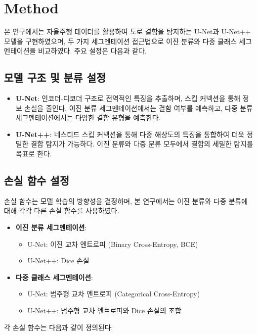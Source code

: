 \section{Method}

본 연구에서는 자율주행 데이터를 활용하여 도로 결함을 탐지하는 U-Net과 U-Net++ 모델을 구현하였으며, 두 가지 세그멘테이션 접근법으로 이진 분류와 다중 클래스 세그멘테이션을 비교하였다. 주요 설정은 다음과 같다.

\subsection{모델 구조 및 분류 설정}
\begin{itemize}
    \item \textbf{U-Net}: 인코더-디코더 구조로 전역적인 특징을 추출하며, 스킵 커넥션을 통해 정보 손실을 줄인다. 이진 분류 세그멘테이션에서는 결함 여부를 예측하고, 다중 분류 세그멘테이션에서는 다양한 결함 유형을 예측한다.
    \item \textbf{U-Net++}: 네스티드 스킵 커넥션을 통해 다중 해상도의 특징을 통합하여 더욱 정밀한 결함 탐지가 가능하다. 이진 분류와 다중 분류 모두에서 결함의 세밀한 탐지를 목표로 한다.
\end{itemize}

\subsection{손실 함수 설정}
손실 함수는 모델 학습의 방향성을 결정하며, 본 연구에서는 이진 분류와 다중 분류에 대해 각각 다른 손실 함수를 사용하였다.
\begin{itemize}
    \item \textbf{이진 분류 세그멘테이션}:
    \begin{itemize}
        \item U-Net: 이진 교차 엔트로피 (Binary Cross-Entropy, BCE)
        \item U-Net++: Dice 손실
    \end{itemize}
    \item \textbf{다중 클래스 세그멘테이션}:
    \begin{itemize}
        \item U-Net: 범주형 교차 엔트로피 (Categorical Cross-Entropy)
        \item U-Net++: 범주형 교차 엔트로피와 Dice 손실의 조합
    \end{itemize}
\end{itemize}

각 손실 함수는 다음과 같이 정의된다:

